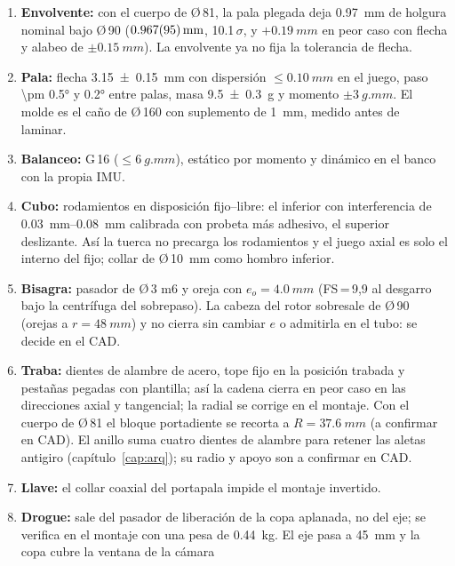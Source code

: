 \begin{resultado}
\begin{enumerate}[leftmargin=*]
  \item \textbf{Envolvente:} con el cuerpo de Ø\,81, la pala plegada deja \SI{0.97}{mm} de holgura
        nominal bajo Ø\,90 ($\SI{0.967 \pm 0.095}{mm}$, \num{10.1}\,$\sigma$, y $+\SI{0.19}{mm}$ en peor caso con
        flecha y alabeo de $\pm\SI{0.15}{mm}$). La envolvente ya no fija la tolerancia de flecha.
  \item \textbf{Pala:} flecha \SI{3.15 \pm 0.15}{mm} con dispersión $\le\SI{0.10}{mm}$ en
        el juego, paso \ang{\pm 0.5} y \ang{0.2} entre palas, masa \SI{9.5 \pm 0.3}{g} y
        momento $\pm\SI{3}{g.mm}$. El molde es el caño de Ø\,160 con suplemento de
        \SI{1}{mm}, medido antes de laminar.
  \item \textbf{Balanceo:} G\,16 ($\le\SI{6}{g.mm}$), estático por momento y dinámico en
        el banco con la propia IMU.
  \item \textbf{Cubo:} rodamientos en disposición fijo--libre: el inferior con
        interferencia de \SIrange{0.03}{0.08}{mm} calibrada con probeta más adhesivo, el
        superior deslizante. Así la tuerca no precarga los rodamientos y el juego axial es
        solo el interno del fijo; collar de Ø\,\SI{10}{mm} como hombro inferior.
  \item \textbf{Bisagra:} pasador de Ø\,3 m6 y oreja con $e_o=\SI{4.0}{mm}$ (FS\,=\,9,9 al desgarro bajo la
        centrífuga del sobrepaso). La cabeza del rotor sobresale de Ø\,90 (orejas a $r=\SI{48}{mm}$) y no cierra sin
        cambiar $e$ o admitirla en el tubo: se decide en el CAD.
  \item \textbf{Traba:} dientes de alambre de acero, tope fijo en la posición trabada y
        pestañas pegadas con plantilla; así la cadena cierra en peor caso en las
        direcciones axial y tangencial; la radial se corrige en el montaje. Con el cuerpo de Ø\,81 el bloque
        portadiente se recorta a $R=\SI{37.6}{mm}$ (a confirmar en CAD). El anillo suma cuatro dientes de alambre
        para retener las aletas antigiro (capítulo~\ref{cap:arq}); su radio y apoyo son a confirmar en CAD.
  \item \textbf{Llave:} el collar coaxial del portapala impide el montaje invertido.
  \item \textbf{Drogue:} sale del pasador de liberación de la copa aplanada, no del eje; se verifica en el
        montaje con una pesa de \SI{0.44}{kg}. El eje pasa a \SI{45}{mm} y la copa cubre la ventana de la cámara

\end{enumerate}
\end{resultado}
